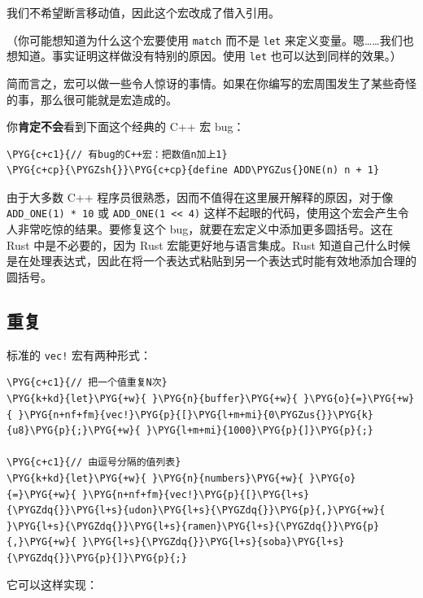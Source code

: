 我们不希望断言移动值，因此这个宏改成了借入引用。

（你可能想知道为什么这个宏要使用 \texttt{match} 而不是 \texttt{let} 来定义变量。嗯……我们也想知道。事实证明这样做没有特别的原因。使用 \texttt{let} 也可以达到同样的效果。）

简而言之，宏可以做一些令人惊讶的事情。如果在你编写的宏周围发生了某些奇怪的事，那么很可能就是宏造成的。

你\textbf{肯定不会}看到下面这个经典的 C++ 宏 bug：

\begin{Verbatim}[commandchars=\\\{\},breaklines=true,breakanywhere=true,fontsize=\codefont,xleftmargin=17bp]
\PYG{c+c1}{// 有bug的C++宏：把数值n加上1}
\PYG{c+cp}{\PYGZsh{}}\PYG{c+cp}{define ADD\PYGZus{}ONE(n) n + 1}
\end{Verbatim}

由于大多数 C++ 程序员很熟悉，因而不值得在这里展开解释的原因，对于像 \texttt{ADD\_ONE(1) * 10} 或 \texttt{ADD\_ONE(1 << 4)} 这样不起眼的代码，使用这个宏会产生令人非常吃惊的结果。要修复这个 bug，就要在宏定义中添加更多圆括号。这在 Rust 中是不必要的，因为 Rust 宏能更好地与语言集成。Rust 知道自己什么时候是在处理表达式，因此在将一个表达式粘贴到另一个表达式时能有效地添加合理的圆括号。

\subsection{重复}

标准的 \texttt{vec!} 宏有两种形式：

\begin{Verbatim}[commandchars=\\\{\},breaklines=true,breakanywhere=true,fontsize=\codefont,xleftmargin=17bp]
\PYG{c+c1}{// 把一个值重复N次}
\PYG{k+kd}{let}\PYG{+w}{ }\PYG{n}{buffer}\PYG{+w}{ }\PYG{o}{=}\PYG{+w}{ }\PYG{n+nf+fm}{vec!}\PYG{p}{[}\PYG{l+m+mi}{0\PYGZus{}}\PYG{k}{u8}\PYG{p}{;}\PYG{+w}{ }\PYG{l+m+mi}{1000}\PYG{p}{]}\PYG{p}{;}

\PYG{c+c1}{// 由逗号分隔的值列表}
\PYG{k+kd}{let}\PYG{+w}{ }\PYG{n}{numbers}\PYG{+w}{ }\PYG{o}{=}\PYG{+w}{ }\PYG{n+nf+fm}{vec!}\PYG{p}{[}\PYG{l+s}{\PYGZdq{}}\PYG{l+s}{udon}\PYG{l+s}{\PYGZdq{}}\PYG{p}{,}\PYG{+w}{ }\PYG{l+s}{\PYGZdq{}}\PYG{l+s}{ramen}\PYG{l+s}{\PYGZdq{}}\PYG{p}{,}\PYG{+w}{ }\PYG{l+s}{\PYGZdq{}}\PYG{l+s}{soba}\PYG{l+s}{\PYGZdq{}}\PYG{p}{]}\PYG{p}{;}
\end{Verbatim}

它可以这样实现：

